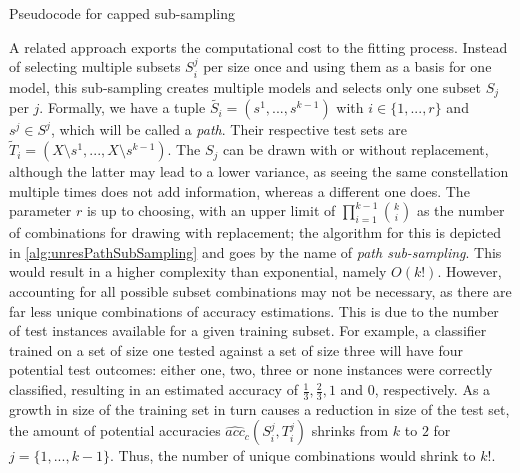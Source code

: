 \begin{algorithm}[h]
	\begin{algorithmic}[1]
		\State {}
		\State {}
		\EndFor
		\EndFor
	\end{algorithmic}
	\caption{Pseudocode for capped sub-sampling}
	\label{alg:cappedSubSampling}
\end{algorithm}

A related approach exports the computational cost to the fitting process. Instead of selecting multiple subsets $S^j_i$ per size once and using them as a basis for one model, this sub-sampling creates multiple models and selects only one subset $S_j$ per $j$. Formally, we have a tuple $\tilde{S_i} = (s^1,...,s^{k-1})$ with $i \in \{1,...,r\}$ and $s^j \in S^j$, which will be called a \textit{path}. Their respective test sets are $\tilde{T}_i = (X \setminus s^1,...,X \setminus s^{k-1})$. The $S_j$ can be drawn with or without replacement, although the latter may lead to a lower variance, as seeing the same constellation multiple times does not add information, whereas a different one does. The parameter $r$ is up to choosing, with an upper limit of $\prod_{i=1}^{k-1} {k \choose i}$ as the number of combinations for drawing with replacement; the algorithm for this is depicted in \ref{alg:unresPathSubSampling} and goes by the name of \textit{path sub-sampling}. This would result in a higher complexity than exponential, namely $O(k!)$. However, accounting for all possible subset combinations may not be necessary, as there are far less unique combinations of accuracy estimations. This is due to the number of test instances available for a given training subset. For example, a classifier trained on a set of size one tested against a set of size three will have four potential test outcomes: either one, two, three or none instances were correctly classified, resulting in an estimated accuracy of $\frac{1}{3}, \frac{2}{3}, 1$ and $0$, respectively. As a growth in size of the training set in turn causes a reduction in size of the test set, the amount of potential accuracies $\widehat{acc}_c(S^j_i, T^j_i)$ shrinks from $k$ to $2$ for $j = \{1, ..., k-1\}$. Thus, the number of unique combinations would shrink to $k!$.

